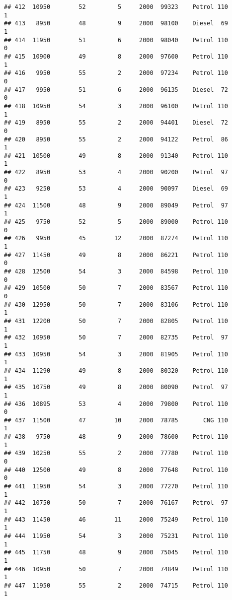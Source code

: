 \documentclass[]{article}
\begin{document}
\begin{verbatim}
## 412  10950        52         5     2000  99323    Petrol 110         1
## 413   8950        48         9     2000  98100    Diesel  69         1
## 414  11950        51         6     2000  98040    Petrol 110         0
## 415  10900        49         8     2000  97600    Petrol 110         1
## 416   9950        55         2     2000  97234    Petrol 110         0
## 417   9950        51         6     2000  96135    Diesel  72         0
## 418  10950        54         3     2000  96100    Petrol 110         1
## 419   8950        55         2     2000  94401    Diesel  72         0
## 420   8950        55         2     2000  94122    Petrol  86         1
## 421  10500        49         8     2000  91340    Petrol 110         1
## 422   8950        53         4     2000  90200    Petrol  97         0
## 423   9250        53         4     2000  90097    Diesel  69         1
## 424  11500        48         9     2000  89049    Petrol  97         1
## 425   9750        52         5     2000  89000    Petrol 110         0
## 426   9950        45        12     2000  87274    Petrol 110         1
## 427  11450        49         8     2000  86221    Petrol 110         0
## 428  12500        54         3     2000  84598    Petrol 110         0
## 429  10500        50         7     2000  83567    Petrol 110         0
## 430  12950        50         7     2000  83106    Petrol 110         1
## 431  12200        50         7     2000  82805    Petrol 110         1
## 432  10950        50         7     2000  82735    Petrol  97         1
## 433  10950        54         3     2000  81905    Petrol 110         1
## 434  11290        49         8     2000  80320    Petrol 110         1
## 435  10750        49         8     2000  80090    Petrol  97         1
## 436  10895        53         4     2000  79800    Petrol 110         0
## 437  11500        47        10     2000  78785       CNG 110         1
## 438   9750        48         9     2000  78600    Petrol 110         1
## 439  10250        55         2     2000  77780    Petrol 110         0
## 440  12500        49         8     2000  77648    Petrol 110         0
## 441  11950        54         3     2000  77270    Petrol 110         1
## 442  10750        50         7     2000  76167    Petrol  97         1
## 443  11450        46        11     2000  75249    Petrol 110         1
## 444  11950        54         3     2000  75231    Petrol 110         1
## 445  11750        48         9     2000  75045    Petrol 110         1
## 446  10950        50         7     2000  74849    Petrol 110         1
## 447  11950        55         2     2000  74715    Petrol 110         1

\end{verbatim}
\end{document}
